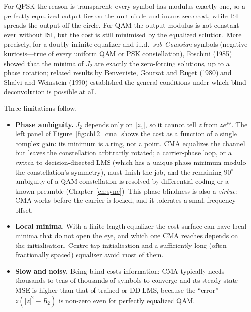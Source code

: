 For QPSK the reason is transparent: every symbol has modulus exactly one, so a perfectly equalized
output lies on the unit circle and incurs zero cost, while ISI spreads the output off the circle.
For QAM the output modulus is not constant even without ISI, but the cost is still minimised by the
equalized solution. More precisely, for a doubly infinite equalizer and i.i.d.\ \emph{sub-Gaussian}
symbols (negative kurtosis---true of every uniform QAM or PSK constellation), Foschini (1985) showed
that the minima of $J_2$ are exactly the zero-forcing solutions, up to a phase rotation; related
results by Benveniste, Goursat and Ruget (1980) and Shalvi and Weinstein (1990) established the
general conditions under which blind deconvolution is possible at all.


Three limitations follow.
\begin{itemize}
\item \textbf{Phase ambiguity.} $J_2$ depends only on $|z_n|$, so it cannot tell $z$ from
$ze^{j\phi}$. The left panel of Figure~\ref{fig:ch12_cma} shows the cost as a function of a single
complex gain: its minimum is a ring, not a point. CMA equalizes the channel but leaves the
constellation arbitrarily rotated; a carrier-phase loop, or a switch to decision-directed LMS
(which has a unique phase minimum modulo the constellation's symmetry), must finish the job, and
the remaining $90^\circ$ ambiguity of a QAM constellation is resolved by differential coding or a
known preamble (Chapter~\ref{ch:sync}). This phase blindness is also a \emph{virtue}: CMA works
before the carrier is locked, and it tolerates a small frequency offset.
\item \textbf{Local minima.} With a finite-length equalizer the cost surface can have local minima
that do not open the eye, and which one CMA reaches depends on the initialisation. Centre-tap
initialisation and a sufficiently long (often fractionally spaced) equalizer avoid most of them.
\item \textbf{Slow and noisy.} Being blind costs information: CMA typically needs thousands to tens
of thousands of symbols to converge and its steady-state MSE is higher than that of trained or DD
LMS, because the ``error'' $z(|z|^2-R_2)$ is non-zero even for perfectly equalized QAM.
\end{itemize}

